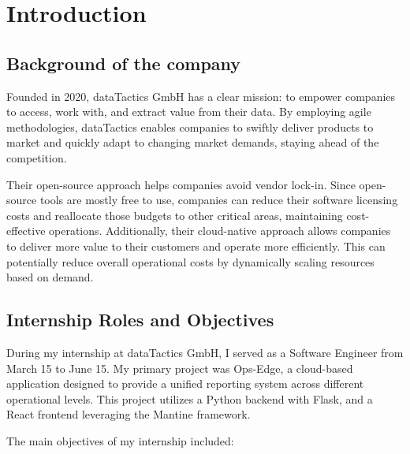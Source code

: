 \chapter{Introduction}
\label{ch:intro}

\section{Background of the company}
\label{sec:intro:background}
Founded in 2020, dataTactics GmbH has a clear mission: to empower companies to access, work with, and extract value from their data. By employing agile methodologies, dataTactics enables companies to swiftly deliver products to market and quickly adapt to changing market demands, staying ahead of the competition.

Their open-source approach helps companies avoid vendor lock-in. Since open-source tools are mostly free to use, companies can reduce their software licensing costs and reallocate those budgets to other critical areas, maintaining cost-effective operations. Additionally, their cloud-native approach allows companies to deliver more value to their customers and operate more efficiently. This can potentially reduce overall operational costs by dynamically scaling resources based on demand.

%
%
\section{Internship Roles and Objectives}
\label{sec:intro:internship_roles_and_objectives}
During my internship at dataTactics GmbH, I served as a Software Engineer from March 15 to June 15. My primary project was Ops-Edge, a cloud-based application designed to provide a unified reporting system across different operational levels. This project utilizes a Python backend with Flask, and a React frontend leveraging the Mantine framework.

The main objectives of my internship included:

